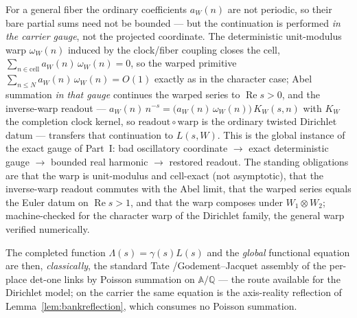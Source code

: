 \documentclass[11pt]{article}
\theoremstyle{definition}
\renewcommand{\Re}{\operatorname{Re}}
\begin{document}
For a general fiber the ordinary coefficients $a_W(n)$ are not periodic, so their bare partial sums need
not be bounded --- but the continuation is performed \emph{in the carrier gauge}, not the projected
coordinate. The deterministic unit-modulus warp $\omega_W(n)$ induced by the clock/fiber coupling closes
the cell, $\sum_{n\in\mathrm{cell}}a_W(n)\,\omega_W(n)=0$, so the warped primitive
$\sum_{n\le N}a_W(n)\,\omega_W(n)=O(1)$ exactly as in the character case; Abel summation \emph{in that
gauge} continues the warped series to $\Re s>0$, and the inverse-warp readout --- $a_W(n)\,n^{-s}=
\bigl(a_W(n)\,\omega_W(n)\bigr)\,K_W(s,n)$ with $K_W$ the completion clock kernel, so
$\mathrm{readout}\circ\mathrm{warp}$ is the ordinary twisted Dirichlet datum --- transfers that
continuation to $L(s,W)$. This is the global instance of the exact gauge of Part~I: bad oscillatory
coordinate $\to$ exact deterministic gauge $\to$ bounded real harmonic $\to$ restored readout. The
standing obligations are that the warp is unit-modulus and cell-exact (not asymptotic), that the
inverse-warp readout commutes with the Abel limit, that the warped series equals the Euler datum on
$\Re s>1$, and that the warp composes under $W_1\otimes W_2$; machine-checked for the character warp of the
Dirichlet family, the general warp verified numerically.

The completed function $\Lambda(s)=\gamma(s)L(s)$ and the \emph{global} functional equation are then,
\emph{classically}, the standard Tate \cite{Tate}/Godement--Jacquet \cite{GJa} assembly of the per-place
det-one links by Poisson summation on $\mathbb A/\mathbb Q$ --- the route available for the Dirichlet model;
on the carrier the same equation is the axis-reality reflection of Lemma~\ref{lem:bankreflection}, which
consumes no Poisson summation.
\end{document}
